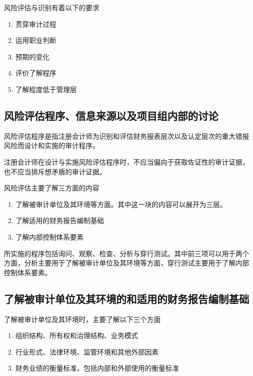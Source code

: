 \documentclass[UTF8,12pt]{ctexart}
\numberwithin{equation}{section} %
\numberwithin{figure}{section}
\numberwithin{table}{section}
\begin{document}
	风险评估与识别有着以下的要求
	\begin{enumerate}
		\item 贯穿审计过程
		
		\item 运用职业判断
		
		\item 预期的变化
		
		\item 评价了解程序
		
		\item 了解程度低于管理层
	\end{enumerate}
	
	
	\subsection{风险评估程序、信息来源以及项目组内部的讨论}
	风险评估程序是指注册会计师为识别和评估财务报表层次以及认定层次的重大错报风险而设计和实施的审计程序。
	
	注册会计师在设计与实施风险评估程序时，不应当偏向于获取佐证性的审计证据，也不应当排斥想矛盾的审计证据。
	
	风险评估主要了解三方面的内容
	\begin{enumerate}
		\item 了解被审计单位及其环境等方面。其中这一块的内容可以展开为三层。
		
		\item 了解适用的财务报告编制基础
		
		\item 了解内部控制体系要素
	\end{enumerate}
	
	所实施的程序包括询问、观察、检查、分析与穿行测试。其中前三项可以用于两个方面，分析主要用于了解被审计单位及其环境等方面，穿行测试主要用于了解内部控制体系要素。
	
	
	
	\subsection{了解被审计单位及其环境的和适用的财务报告编制基础}
	了解被审计单位及其环境时，主要了解以下三个方面
	\begin{enumerate}
		\item 组织结构、所有权和治理结构、业务模式
		
		\item 行业形式、法律环境、监管环境和其他外部因素
		
		\item 财务业绩的衡量标准，包括内部和外部使用的衡量标准
	\end{enumerate}
	
\end{document}
